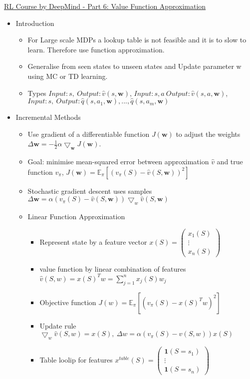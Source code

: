 \href{https://www.youtube.com/watch?v=UoPei5o4fps}{RL Course by DeepMind - Part 6: Value Function Approximation}
\begin{itemize}[noitemsep,nolistsep]
	\item Introduction
	\begin{itemize}[noitemsep,nolistsep]
		\item For Large scale MDPs a lookup table is not feasible and it is to slow to learn. Therefore use function approximation.
		\item Generalise from seen states to unseen states and Update parameter w using MC or TD learning.
		\item Types $Input: s,\ Output: \hat{v}(s,\mathbf{w})$, $Input: s, a\ Output: \hat{v}(s,a, \mathbf{w})$, $Input: s,\ Output: \hat{q}(s,a_1,\mathbf{w}),...,\hat{q}(s,a_m,\mathbf{w})$
	\end{itemize}
	\item Incremental Methods
	\begin{itemize}[noitemsep,nolistsep]
		\item Use gradient of a differentiable function $J(\mathbf{w})$ to adjust the weights $\Delta \mathbf{w} = -\frac{1}{2}\alpha \bigtriangledown_\mathbf{w} J(\mathbf{w})$.
		\item Goal: minimise mean-squared error between approximation $\hat{v}$ and true function $v_\pi$, $J(\mathbf{w}) = \mathbb{E}_\pi [(v_\pi(S) - \hat{v}(S,\mathbf{w}))^2]$
		\item Stochastic gradient descent uses samples $\Delta \mathbf{w} = \alpha (v_\pi(S) - \hat{v}(S,\mathbf{w})) \bigtriangledown_w \hat{v}(S,\mathbf{w})$
		\item Linear Function Approximation
		\begin{itemize}[noitemsep,nolistsep]
			\item Represent state by a feature vector $x(S) = \begin{pmatrix} x_1(S)\\ \vdots \\ x_n(S) \end{pmatrix}$
			\item value function by linear combination of features $\hat{v}(S,w) = x(S)^Tw = \sum_{j=1}^n x_j(S)w_j$
			\item Objective function $J(w) = \mathbb{E}_\pi [(v_\pi(S) - x(S)^Tw)^2]$
			\item Update rule $\bigtriangledown_w \hat{v}(S,w) = x(S),\ \Delta w = \alpha (v_\pi(S) - \hat{v}(S,w))x(S)$
			\item Table loolip for features $x^{table}(S) = \begin{pmatrix} \mathbf{1} (S = s_1)\\ \vdots \\ \mathbf{1} (S = s_n) \end{pmatrix}$

\end{itemize}
\end{itemize}
\end{itemize}
